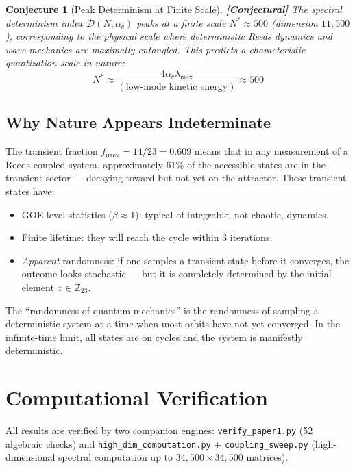 \documentclass[12pt,a4paper]{article}
\newcommand{\conjectural}[1]{\textcolor{conjectural}{\textbf{[Conjectural]}} #1}
\newtheorem{conjecture}[theorem]{Conjecture}
\theoremstyle{definition}
\theoremstyle{remark}
\newcommand{\Zp}{\mathbb{Z}_{23}}
\begin{document}
\begin{conjecture}[Peak Determinism at Finite Scale]
\label{conj:peak_D}
\conjectural{The spectral determinism index $\mathcal{D}(N, \alpha_c)$ peaks at
a finite scale $N^* \approx 500$ (dimension $11{,}500$), corresponding to the
physical scale where deterministic Reeds dynamics and wave mechanics are maximally
entangled. This predicts a characteristic \emph{quantization scale} in nature:}
\begin{equation}
  N^* \approx \frac{4\alpha_c \lambda_{\max}}{(\text{low-mode kinetic energy})} \approx 500
\end{equation}
\end{conjecture}

\subsection{Why Nature Appears Indeterminate}

The transient fraction $f_{\text{irrev}} = 14/23 = 0.609$ means that in any
measurement of a Reeds-coupled system, approximately $61\%$ of the accessible
states are in the transient sector --- decaying toward but not yet on the
attractor. These transient states have:
\begin{itemize}
  \item GOE-level statistics ($\beta \approx 1$): typical of integrable, not
  chaotic, dynamics.
  \item Finite lifetime: they will reach the cycle within 3 iterations.
  \item \emph{Apparent} randomness: if one samples a transient state before it
  converges, the outcome looks stochastic --- but it is completely determined by
  the initial element $x \in \Zp$.
\end{itemize}

The ``randomness of quantum mechanics'' is the randomness of sampling a
deterministic system at a time when most orbits have not yet converged. In the
infinite-time limit, all states are on cycles and the system is manifestly
deterministic.

\section{Computational Verification}
\label{sec:verification}

All results are verified by two companion engines:
\texttt{verify\_paper1.py} (52 algebraic checks) and
\texttt{high\_dim\_computation.py} + \texttt{coupling\_sweep.py}
(high-dimensional spectral computation up to $34{,}500 \times 34{,}500$ matrices).
\end{document}
